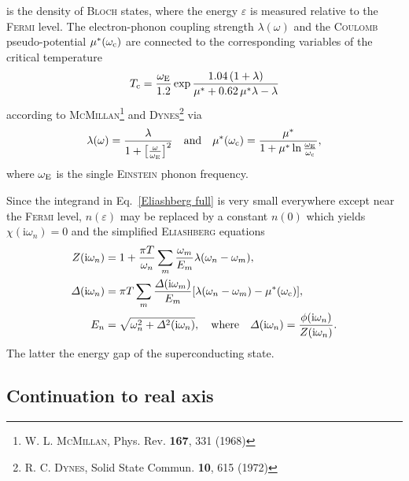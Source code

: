 \documentclass[twocolumn]{article}
\def\I{\mathrm i}
\def\sub#1{\sb{\mathrm{#1}}}
\let\epsilon\varepsilon
\let\Delta\varDelta
\newlength\gap
\let\vol\textbf
\let\name\textsc
\begin{document}
   is  the  density of  \name{Bloch}  states,  where  the energy  $\epsilon$  is
   measured  relative to  the \name{Fermi}  level. The  electron-phonon coupling
   strength   $\lambda(\omega)$   and    the   \name{Coulomb}   pseudo-potential
   $\mu^*(\omega \sub  c)$ are connected  to the corresponding variables  of the
   critical temperature
   \begin{align}
      T \sub c = \frac{\omega \sub E}{1.2}
      \exp \frac{1.04 \, (1 + \lambda)}{\mu^* + 0.62 \, \mu^* \lambda - \lambda}
      \label{TcMD}
   \end{align}
   according  to  \name{McMillan}\footnote{W.  L.  \name{McMillan},  Phys.  Rev.
   \vol{167}, 331  (1968)} and  \name{Dynes}\footnote{R. C.  \name{Dynes}, Solid
   State Commun. \vol{10}, 615 (1972)} via
   \begin{align*}
      \lambda(\omega) = \frac \lambda
      {1 + \big[ \frac \omega {\omega \sub E} \big]^2}
      \quad \text{and} \quad
      \mu^*(\omega \sub c) = \frac {\mu^*}
      {1 + \mu^* \ln \frac{\omega \sub E}{\omega \sub c}},
   \end{align*}
   where $\omega \sub E$ is the single \name{Einstein} phonon frequency.

   Since the  integrand in  Eq.~\ref{Eliashberg full}  is very  small everywhere
   except  near the  \name{Fermi}  level,  $n(\epsilon)$ may  be  replaced by  a
   constant  $n(0)$ which  yields $\chi(\I  \omega_n)  = 0$  and the  simplified
   \name{Eliashberg} equations
   \begin{align}
      \begin{split}
         Z(\I \omega_n) &= 1 + \frac{\pi T}{\omega_n} \sum_m
         \frac{\omega_m}{E_m}
         \lambda(\omega_n - \omega_m),
         \\
         \Delta(\I \omega_n) &= \pi T \sum_m
         \frac{\Delta(\I \omega_m)}{E_m}
         [\lambda(\omega_n - \omega_m) - \mu^*(\omega \sub c)],
         \\
         E_n &= \sqrt{\omega_n^2 + \Delta^2(\I \omega_n)},
         \quad \text{where} \quad
         \Delta(\I \omega_n) = \frac{\phi(\I \omega_n)}{Z(\I \omega_n)}.
      \end{split}
      \label{Eliashberg simple}
   \end{align}
   The latter the energy gap of the superconducting state.

   \subsection{Continuation to real axis}
\end{document}
